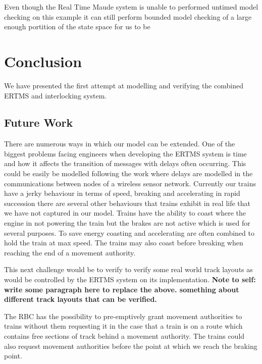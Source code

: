 Even though the Real Time Maude system is unable to performed untimed model checking on this example it can still perform bounded model checking of a large enough portition of the state space for us to be

\section{Conclusion}
 We have presented the first attempt at modelling and verifying the combined ERTMS and interlocking system.
\subsection*{Future Work}
There are numerous ways in which our model can be extended. One of the biggest problems facing engineers when developing the ERTMS system is time and how it affects the transition of messages with delays often occurring. This could be easily be modelled following the work \cite{PO07} where delays are modelled in the communications between nodes of a wireless sensor network. Currently our trains have a jerky behaviour in terms of speed, breaking and accelerating in rapid succession there are several other behaviours that trains exhibit in real life that we have not captured in our model. Trains have the ability to coast where the engine in not powering the train but the brakes are not active which is used for several purposes. To save energy coasting and accelerating are often combined to hold the train at max speed. The trains may also coast before breaking when reaching the end of a movement authority.

This next challenge would be to verify to verify some real world track layouts as would be controlled by the ERTMS system on its implementation. \textbf{Note to self: write some paragraph here to replace the above. something about different track layouts that can be verified.}


The RBC has the possibility to pre-emptively grant movement authorities to trains without them requesting it in the case that a train is on a route which contains free sections of track behind a movement authority.  The trains could also request movement authorities before the point at which we reach the braking point.
